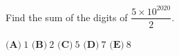 Find the sum of the digits of $\dfrac{5\times10^{2020}}{2}$.

$\textbf{(A)}\ $$1$ \qquad $\textbf{(B)}\ $$2$ \qquad $\textbf{(C)}\ $$5$ \qquad $\textbf{(D)}\ $$7$ \qquad $\textbf{(E)}\ $$8$
